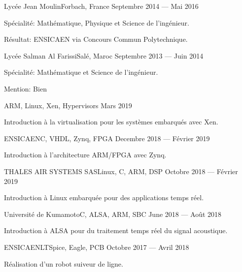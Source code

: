 \documentclass{faresume}
\begin{document}
\begin{column}[\leftcolumnwidth]
			{Lyc\'ee Jean Moulin}{Forbach, France}
			{Septembre 2014 --- Mai 2016}
			{
				\begin{additems}
					\item Sp\'ecialit\'e: Math\'ematique, Physique et Science de l'ing\'enieur.
					\item R\'esultat: ENSICAEN via Concours Commun Polytechnique.
				\end{additems}
			}

			{Lyc\'ee Salman Al Farissi}{Sal\'e, Maroc}
			{Septembre 2013 --- Juin 2014}
			{
				\begin{additems}
					\item Sp\'ecialit\'e: Math\'ematique et Science de l'ing\'enieur.
					\item Mention: Bien
				\end{additems}
			}


			{}{ARM, Linux, Xen, Hypervisors}
			{Mars 2019}
			{
				\begin{additems}
					\item Introduction \`a la virtualisation pour les syst\`emes embarqu\'es avec Xen.
				\end{additems}
			}

			{ENSICAEN}{C, VHDL, Zynq, FPGA}
			{Decembre 2018 --- F\'evrier 2019}
			{
				\begin{additems}
					\item Introduction \`a l'architecture ARM/FPGA avec Zynq.
				\end{additems}
			}

			{THALES AIR SYSTEMS SAS}{Linux, C, ARM, DSP}
			{Octobre 2018 --- F\'evrier 2019}
			{
				\begin{additems}
					\item Introduction \`a Linux embarqu\'ee pour des applications temps r\'eel.
				\end{additems}
			}

			{Universit\'e de Kumamoto}{C, ALSA, ARM, SBC}
			{June 2018 --- Ao\^ut 2018}
			{
				\begin{additems}
					\item Introduction \`a ALSA pour du traitement temps r\'eel du signal acoustique.
				\end{additems}
			}

			{ENSICAEN}{LTSpice, Eagle, PCB}
			{Octobre 2017 --- Avril 2018}
			{
				\begin{additems}
					\item R\'ealisation d'un robot suiveur de ligne.
				\end{additems}
			}

\end{column}
\end{document}
